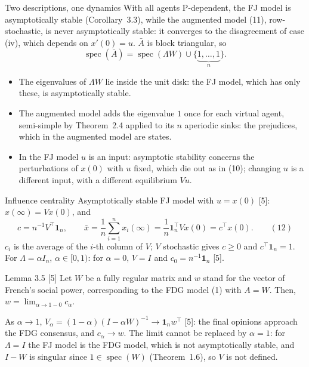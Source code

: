 \begin{frame}[label=bk-augmented2]{Two descriptions, one dynamics}
  \small
  With all agents P-dependent, the FJ model is asymptotically stable (Corollary~3.3),
  while the augmented model (11), row-stochastic, is never asymptotically stable: it
  converges to the disagreement of case (iv), which depends on $x'(0) = u$. $\bar A$ is
  block triangular, so
  \[
    \operatorname{spec}(\bar A) = \operatorname{spec}(\Lambda W) \cup
    \{\underbrace{1, \dots, 1}_{n}\}.
  \]
  \begin{itemize}
    \item The eigenvalues of $\Lambda W$ lie inside the unit disk: the FJ model, which has
          only these, is asymptotically stable.
    \item The augmented model adds the eigenvalue $1$ once for each virtual agent,
          semi-simple by Theorem~2.4 applied to its $n$ aperiodic sinks: the prejudices,
          which in the augmented model are \alert{states}.
    \item In the FJ model $u$ is an \alert{input}: asymptotic stability concerns the
          perturbations of $x(0)$ with $u$ fixed, which die out as in (10); changing $u$
          is a different input, with a different equilibrium $Vu$.
  \end{itemize}
\end{frame}

\begin{frame}[label=bk-centrality]{Influence centrality}
  \small
  Asymptotically stable FJ model with $u = x(0)$ [5]: $x(\infty) = V x(0)$, and
  \[ c = n^{-1} V^\top \mathbf{1}_n, \qquad
     \bar x = \frac{1}{n} \sum_{i=1}^{n} x_i(\infty) = \frac{1}{n} \mathbf{1}_n^\top V x(0)
            = c^\top x(0). \qquad (12) \]
  $c_i$ is the average of the $i$-th column of $V$; $V$ stochastic gives $c \geq 0$ and
  $c^\top \mathbf{1}_n = 1$. For $\Lambda = \alpha I_n$, $\alpha \in [0,1)$: for $\alpha = 0$,
  $V = I$ and $c_0 = n^{-1}\mathbf{1}_n$ [5].
  \begin{block}{Lemma 3.5 [5]}
    Let $W$ be a fully regular matrix and $w$ stand for the vector of French's social power,
    corresponding to the FDG model (1) with $A = W$. Then, $w = \lim_{\alpha \to 1-0}
    c_\alpha$.
  \end{block}
  As $\alpha \to 1$, $V_\alpha = (1 - \alpha)(I - \alpha W)^{-1} \to \mathbf{1}_n w^\top$
  [5]: the final opinions approach the FDG consensus, and $c_\alpha \to w$. The limit
  cannot be replaced by $\alpha = 1$: for $\Lambda = I$ the FJ model is the FDG model, which
  is not asymptotically stable, and $I - W$ is singular since $1 \in \operatorname{spec}(W)$
  (Theorem~1.6), so $V$ is not defined.
\end{frame}

